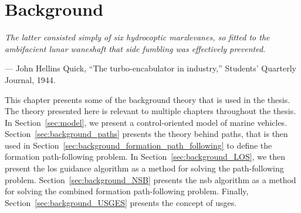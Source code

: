 \chapter{Background}
\label{chap:background}

\setlength{\epigraphwidth}{0.55\textwidth}
\epigraph{ \it
    The latter consisted simply of six hydrocoptic marzlevanes, so fitted to the ambifacient lunar waneshaft that side fumbling was effectively prevented.
}{--- John Hellins Quick, ``The turbo-encabulator in industry,'' Students' Quarterly Journal, 1944.}

This chapter presents some of the background theory that is used in the thesis.
The theory presented here is relevant to multiple chapters throughout the thesis.
In Section~\ref{sec:model}, we present a control-oriented model of marine vehicles.
Section~\ref{sec:background_paths} presents the theory behind paths, that is then used in Section~\ref{sec:background_formation_path_following} to define the formation path-following problem.
In Section~\ref{sec:background_LOS}, we then present the \acrlong{los} guidance algorithm as a method for solving the path-following problem.
Section~\ref{sec:background_NSB} presents the \gls{nsb} algorithm as a method for solving the combined formation path-following problem.
Finally, Section~\ref{sec:background_USGES} presents the concept of \acrlong{usges}.







